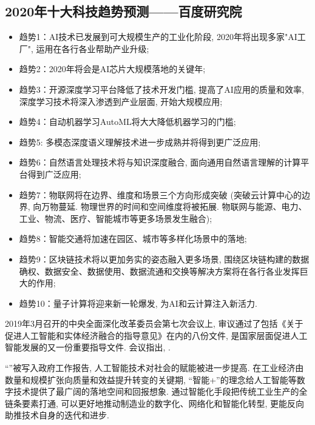 \subsection{2020年十大科技趋势预测——百度研究院}
\begin{itemize}
\item 趋势1：AI技术已发展到可大规模生产的工业化阶段, 2020年将出现多家"AI工厂", 运用在各行各业帮助产业升级;
\item 趋势2：2020年将会是AI芯片大规模落地的关键年;
\item 趋势3：开源深度学习平台降低了技术开发门槛, 提高了AI应用的质量和效率, 深度学习技术将深入渗透到产业层面, 开始大规模应用;
\item 趋势4：自动机器学习AutoML将大大降低机器学习的门槛;
\item 趋势5: 多模态深度语义理解技术进一步成熟并将得到更广泛应用;
\item 趋势6：自然语言处理技术将与知识深度融合, 面向通用自然语言理解的计算平台得到广泛应用;
\item 趋势7：物联网将在边界、维度和场景三个方向形成突破 (突破云计算中心的边界, 向万物蔓延. 物理世界的时间和空间维度将被拓展. 物联网与能源、电力、工业、物流、医疗、智能城市等更多场景发生融合);
\item 趋势8：智能交通将加速在园区、城市等多样化场景中的落地;
\item 趋势9：区块链技术将以更加务实的姿态融入更多场景, 围绕区块链构建的数据确权、数据安全、数据使用、数据流通和交换等解决方案将在各行各业发挥巨大的作用;
\item 趋势10：量子计算将迎来新一轮爆发, 为AI和云计算注入新活力.
\end{itemize}

2019年3月召开的中央全面深化改革委员会第七次会议上, 审议通过了包括《关于促进人工智能和实体经济融合的指导意见》在内的八份文件, 是国家层面促进人工智能发展的又一份重要指导文件.
会议指出, .

“”被写入政府工作报告, 人工智能技术对社会的赋能被进一步提高. 在工业经济由数量和规模扩张向质量和效益提升转变的关键期, “智能+”的理念给人工智能等数字技术提供了最广阔的落地空间和回报想象. 通过智能化手段把传统工业生产的全链条要素打通, 可以更好地推动制造业的数字化、网络化和智能化转型, 更能反向助推技术自身的迭代和进步.

